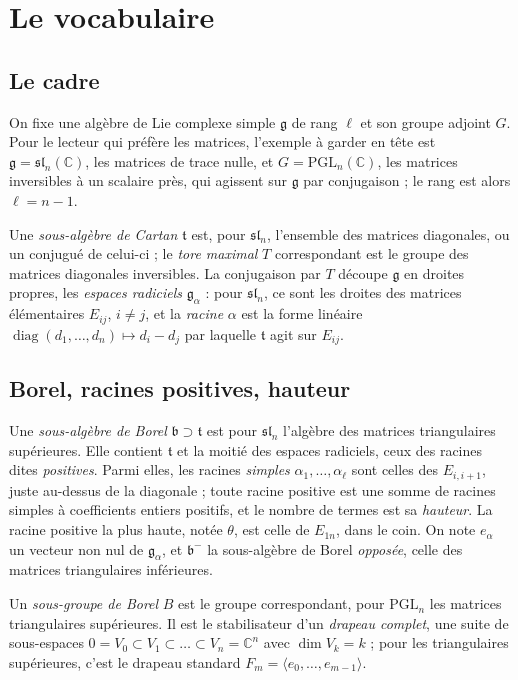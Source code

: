 \documentclass[11pt,a4paper]{amsart}
\theoremstyle{definition}
\theoremstyle{plain}
\theoremstyle{remark}
\newcommand{\C}{\mathbb C}
\newcommand{\g}{\mathfrak g}
\newcommand{\tl}{\mathfrak t}
\newcommand{\bl}{\mathfrak b}
\newcommand{\PGL}{\mathrm{PGL}}
\begin{document}
\section{Le vocabulaire}

\subsection{Le cadre}

On fixe une algèbre de Lie complexe simple $\g$ de rang $\ell$ et son groupe adjoint $G$. Pour le lecteur qui préfère les matrices, l'exemple à garder en tête est $\g = \mathfrak{sl}_n(\C)$, les matrices de trace nulle, et $G = \PGL_n(\C)$, les matrices inversibles à un scalaire près, qui agissent sur $\g$ par conjugaison ; le rang est alors $\ell = n-1$.

Une \emph{sous-algèbre de Cartan} $\tl$ est, pour $\mathfrak{sl}_n$, l'ensemble des matrices diagonales, ou un conjugué de celui-ci ; le \emph{tore maximal} $T$ correspondant est le groupe des matrices diagonales inversibles. La conjugaison par $T$ découpe $\g$ en droites propres, les \emph{espaces radiciels} $\g_\alpha$ : pour $\mathfrak{sl}_n$, ce sont les droites des matrices élémentaires $E_{ij}$, $i \neq j$, et la \emph{racine} $\alpha$ est la forme linéaire $\operatorname{diag}(d_1,\dots,d_n) \mapsto d_i - d_j$ par laquelle $\tl$ agit sur $E_{ij}$.

\subsection{Borel, racines positives, hauteur}

Une \emph{sous-algèbre de Borel} $\bl \supset \tl$ est pour $\mathfrak{sl}_n$ l'algèbre des matrices triangulaires supérieures. Elle contient $\tl$ et la moitié des espaces radiciels, ceux des racines dites \emph{positives}. Parmi elles, les racines \emph{simples} $\alpha_1, \dots, \alpha_\ell$ sont celles des $E_{i,i+1}$, juste au-dessus de la diagonale ; toute racine positive est une somme de racines simples à coefficients entiers positifs, et le nombre de termes est sa \emph{hauteur}. La racine positive la plus haute, notée $\theta$, est celle de $E_{1n}$, dans le coin. On note $e_\alpha$ un vecteur non nul de $\g_\alpha$, et $\bl^-$ la sous-algèbre de Borel \emph{opposée}, celle des matrices triangulaires inférieures.

Un \emph{sous-groupe de Borel} $B$ est le groupe correspondant, pour $\PGL_n$ les matrices triangulaires supérieures. Il est le stabilisateur d'un \emph{drapeau complet}, une suite de sous-espaces $0 = V_0 \subset V_1 \subset \dots \subset V_n = \C^n$ avec $\dim V_k = k$ ; pour les triangulaires supérieures, c'est le drapeau standard $F_m = \langle e_0, \dots, e_{m-1}\rangle$.
\end{document}
